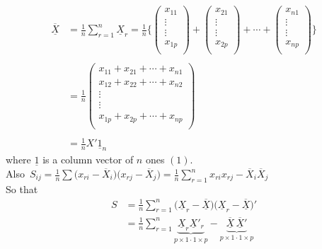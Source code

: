\documentclass[11pt,a4paper]{article}
\theoremstyle{definition}
\begin{document}
\begin{align*}
\overline{\underline{X}} & = \frac{1}{n}\sum^n_{r=1}\underline{X}_r= \frac{1}{n}\Bigg\{
\begin{pmatrix}
x_{11}\\
\vdots\\
\vdots\\
x_{1p}\\
\end{pmatrix}
+ 
\begin{pmatrix}
x_{21}\\
\vdots\\
\vdots\\
x_{2p}\\
\end{pmatrix}
+ \cdots+
\begin{pmatrix}
x_{n1}\\
\vdots\\
\vdots\\
x_{np}\\
\end{pmatrix}
\Bigg\}\\\\
& = \frac{1}{n}
\begin{pmatrix}
x_{11} + x_{21} +\cdots+ x_{n1}\\
x_{12} + x_{22} + \cdots+ x_{n2}\\
\vdots\\
\vdots\\
x_{1p} + x_{2p} + \cdots+ x_{np}\\
\end{pmatrix}\\\\
& = \frac{1}{n}X'\underline{1}_n\tag{6}
\end{align*}
where $\underline{1}$ is a column vector of $n$ ones $(1)$.\\

Also
\,$\displaystyle{S_{ij}=\frac{1}{n}\sum \big(x_{ri}-\overline{X}_i\big)\big(x_{rj}-\overline{X}_j\big) = \frac{1}{n}\sum^n_{r=1}x_{ri}x_{rj}-\overline{X}_i\overline{X}_j}$\\

So that 
\begin{align*}
S & = \frac{1}{n}\sum^n_{r=1}\big(\underline{X}_r-\overline{\underline{X}}\big)\big(\underline{X}_r-\overline{\underline{X}}\big)'\\
  & = \frac{1}{n}\sum^n_{r=1} \underbrace{\underline{X}_r\underline{X}'_r}_{p\times 1 \cdot 1\times p}-\underbrace{\overline{\underline{X}}\,\overline{\underline{X}}'}_{p\times 1 \cdot 1\times p}\tag{6}
\end{align*}
\end{document}
